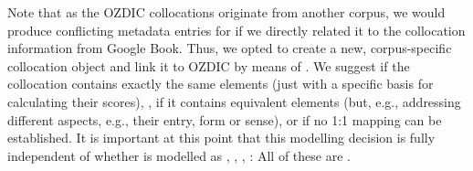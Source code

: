 \documentclass[output=paper,colorlinks,citecolor=brown]{langscibook}
\begin{document}
\noindent
Note that as the OZDIC collocations originate from another corpus, we would produce conflicting metadata entries for  if we directly related it to the collocation information from Google Book. Thus, we opted to create a new, corpus-specific collocation object and link it to OZDIC by means of . We suggest  if the collocation contains exactly the same elements (just with a specific basis for calculating their scores),
, if it contains equivalent elements (but, e.g., addressing different aspects, e.g., their entry, form or sense), or  if no 1:1 mapping can be established.
%
%
%
It is important at this point that this modelling decision is fully independent of whether  is %
modelled as ,
, , : All of these are .
\end{document}
